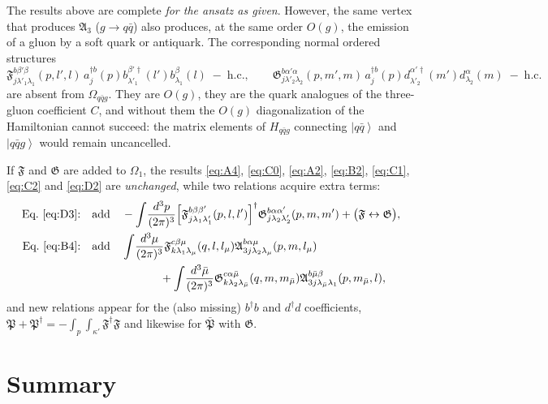 \documentclass[11pt]{article}
\newcommand{\mf}{\mathfrak}
\newcommand{\dg}{\dagger}
\newcommand{\ip}[1]{\int\!\frac{d^{3}#1}{(2\pi)^{3}}}
\newcommand{\ket}[1]{\left|#1\right\rangle}
\newcommand{\OM}{\Omega}
\begin{document}
\begin{warn}
The results above are complete \emph{for the ansatz as given}. However, the same vertex that
produces $\mf A_{3}$ ($g\to q\bar q$) also produces, at the same order $O(g)$, the emission of a
gluon by a soft quark or antiquark. The corresponding normal ordered structures
\begin{equation}
\mf F^{b\beta'\beta}_{j\lambda'_{1}\lambda_{1}}(p,l',l)\,a^{\dg b}_{j}(p)b^{\beta'\dg}_{\lambda'_{1}}(l')b^{\beta}_{\lambda_{1}}(l)
\;-\;\mathrm{h.c.},
\qquad
\mf G^{b\alpha'\alpha}_{j\lambda'_{2}\lambda_{2}}(p,m',m)\,a^{\dg b}_{j}(p)d^{\alpha'\dg}_{\lambda'_{2}}(m')d^{\alpha}_{\lambda_{2}}(m)
\;-\;\mathrm{h.c.}
\end{equation}
are absent from $\OM_{q\bar qg}$. They are $O(g)$, they are the quark analogues of the three-gluon
coefficient $C$, and without them the $O(g)$ diagonalization of the Hamiltonian cannot succeed:
the matrix elements of $H_{q\bar qg}$ connecting $\ket{q\bar q}$ and $\ket{q\bar q g}$ would remain
uncancelled.

If $\mf F$ and $\mf G$ are added to $\OM_{1}$, the results \eqref{eq:A4}, \eqref{eq:C0},
\eqref{eq:A2}, \eqref{eq:B2}, \eqref{eq:C1}, \eqref{eq:C2} and \eqref{eq:D2} are
\emph{unchanged}, while two relations acquire extra terms:
\begin{align}
\text{Eq.~\eqref{eq:D3}:}\quad&\text{add}\quad
-\ip{p}\Big[\mf F^{b\beta\beta'}_{j\lambda_{1}\lambda'_{1}}(p,l,l')\Big]^{\dg}
\mf G^{b\alpha\alpha'}_{j\lambda_{2}\lambda'_{2}}(p,m,m')+\big(\mf F\leftrightarrow\mf G\big),
\\
\text{Eq.~\eqref{eq:B4}:}\quad&\text{add}\quad
\ip{\mu}\mf F^{c\beta\mu}_{k\lambda_{1}\lambda_{\mu}}(q,l,l_{\mu})
\mf A^{b\alpha\mu}_{3j\lambda_{2}\lambda_{\mu}}(p,m,l_{\mu})
\nonumber\\&\hspace{2.1cm}
+\ip{\bar\mu}\mf G^{c\alpha\bar\mu}_{k\lambda_{2}\lambda_{\bar\mu}}(q,m,m_{\bar\mu})
\mf A^{b\bar\mu\beta}_{3j\lambda_{\bar\mu}\lambda_{1}}(p,m_{\bar\mu},l),
\end{align}
and new relations appear for the (also missing) $b^{\dg}b$ and $d^{\dg}d$ coefficients,
$\mathfrak P+\mathfrak P^{\dg}=-\int_{p}\int_{\kappa'}\mf F^{\dg}\mf F$ and likewise for
$\bar{\mathfrak P}$ with $\mf G$.
\end{warn}

\section{Summary}
\end{document}
